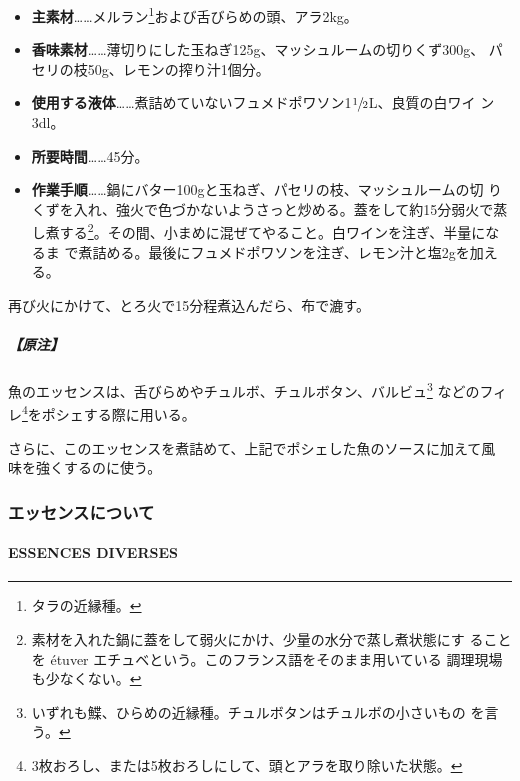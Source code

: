 \documentclass[twoside,12Q,b5j]{escoffierltjsbook}
\newenvironment{recette}{\begin{small}\begin{spacing}{1}\begin{multicols}{2}}{\end{multicols}\end{spacing}\end{small}}
\begin{document}
\begin{recette}
\begin{itemize}
\item
  \textbf{主素材}\ldots{}\ldots{}メルラン\footnote{タラの近縁種。}および舌びらめの頭、アラ2kg。
\item
  \textbf{香味素材}\ldots{}\ldots{}薄切りにした玉ねぎ125g、マッシュルームの切りくず300g、
  パセリの枝50g、レモンの搾り汁1個分。
\item
  \textbf{使用する液体}\ldots{}\ldots{}煮詰めていないフュメドポワソン1\(\sfrac{1}{2}\)L、良質の白ワイ
  ン3dl。
\item
  \textbf{所要時間}\ldots{}\ldots{}45分。
\item
  \textbf{作業手順}\ldots{}\ldots{}鍋にバター100gと玉ねぎ、パセリの枝、マッシュルームの切
  りくずを入れ、強火で色づかないようさっと炒める。蓋をして約15分弱火で蒸
  し煮する\footnote{素材を入れた鍋に蓋をして弱火にかけ、少量の水分で蒸し煮状態にす
    ることを étuver エチュベという。このフランス語をそのまま用いている
    調理現場も少なくない。}。その間、小まめに混ぜてやること。白ワインを注ぎ、半量になるま
  で煮詰める。最後にフュメドポワソンを注ぎ、レモン汁と塩2gを加える。
\end{itemize}

再び火にかけて、とろ火で15分程煮込んだら、布で漉す。

\subparagraph{【原注】}\label{ux539fux6ce8-4}

魚のエッセンスは、舌びらめやチュルボ、チュルボタン、バルビュ\footnote{いずれも鰈、ひらめの近縁種。チュルボタンはチュルボの小さいもの
  を言う。} などのフィレ\footnote{3枚おろし、または5枚おろしにして、頭とアラを取り除いた状態。}をポシェする際に用いる。

さらに、このエッセンスを煮詰めて、上記でポシェした魚のソースに加えて風
味を強くするのに使う。

\vspace*{1.7\zw}

\subsubsection{エッセンスについて}\label{ux30a8ux30c3ux30bbux30f3ux30b9ux306bux3064ux3044ux3066}

\paragraph{ESSENCES DIVERSES}\label{essences-diverses}



\end{recette}
\end{document}

